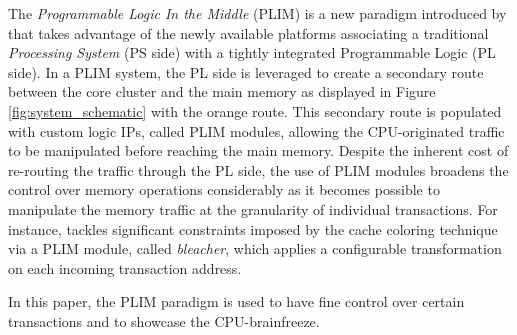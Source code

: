
    The \emph{Programmable Logic In the Middle} (PLIM) is a new paradigm introduced by \cite{PLIM20} that takes advantage of the newly available platforms associating a traditional \emph{Processing System} (PS side) with a tightly integrated Programmable Logic (PL side).
    In a PLIM system, the PL side is leveraged to create a secondary route between the core cluster and the main memory as displayed in Figure \ref{fig:system_schematic} with the orange route.
    This secondary route is populated with custom logic IPs, called PLIM modules, allowing the CPU-originated traffic to be manipulated before reaching the main memory.
    Despite the inherent cost of re-routing the traffic through the PL side, the use of PLIM modules broadens the control over memory operations considerably as it becomes possible to manipulate the memory traffic at the granularity of individual transactions.
    For instance, \cite{PLIM20} tackles significant constraints imposed by the cache coloring technique via a PLIM module, called \emph{bleacher}, which applies a configurable transformation on each incoming transaction address.

    In this paper, the PLIM paradigm is used to have fine control over certain transactions and to showcase the CPU-brainfreeze.
